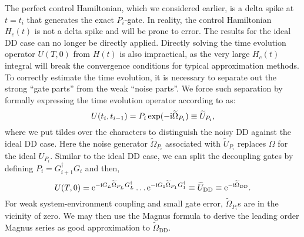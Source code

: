 \documentclass[b5paper,11pt]{article}
\newcommand{\wt}[1]{\widetilde{#1}}
\newcommand{\rDD}{\mathrm{DD}}
\begin{document}
The perfect control Hamiltonian, which we considered earlier, is a delta spike  at $t=t_i$ that generates the exact $P_i$-gate.  In reality, the control Hamiltonian $H_c(t)$ is not a delta spike and will be prone to error. The results for the ideal DD case can no longer be directly applied. 
Directly solving the time evolution operator $U(T,0)$ from $H(t)$ is also impractical, as the very large $H_c(t)$ integral will break the convergence conditions for typical approximation methods. To correctly estimate the time evolution, it is necessary to separate out the strong ``gate parts'' from the weak ``noise parts''. 
We force such separation by formally expressing the time evolution operator according to  as:
\begin{equation}\label{eq:noisy-gate-formal}
U(t_{i},t_{i-1})=
 P_i \exp(-\upi \wt\Omega_{P_i}) \equiv \wt U_{P_i}, 
\end{equation}
where we put tildes over the characters to distinguish the noisy DD against the ideal DD case. 
Here the noise generator $\wt\Omega_{P_i}$ associated with $\wt U_{P_i}$ replaces  $\Omega$ for the ideal $U_{P_i}$. 
Similar to the ideal DD case, we can split the decoupling gates by defining $P_i=G_{i+1}^\dagger G_{i}$ and then,
\begin{equation}
  U(T,0) = \upe^{-\upi  G_L \wt\Omega_{P_L}  G_L^\dagger} \ldots
  \upe^{-\upi G_1\wt\Omega_{P_1}G_1^\dagger} 
  \equiv \wt U_\rDD \equiv\upe^{-\upi\wt\Omega_\rDD} .
\end{equation}
For weak system-environment coupling and small gate error,  $\wt\Omega_{P_i}$s are in the vicinity of zero.
We may then use the Magnus formula to derive the leading order Magnus series as good approximation to $\wt\Omega_\rDD$.
\end{document}
